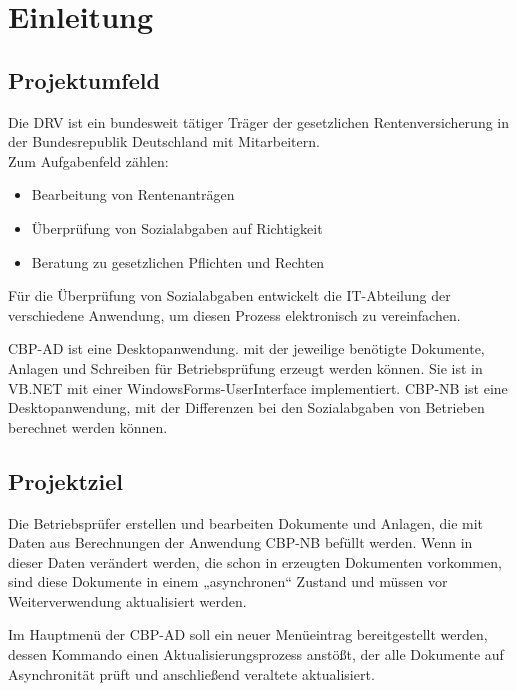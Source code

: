 
\section{Einleitung}
\label{sec:Einleitung}


\subsection{Projektumfeld} 
\label{sec:Projektumfeld}

Die \ac{DRV} ist ein bundesweit tätiger Träger der gesetzlichen Rentenversicherung in der Bundesrepublik Deutschland
mit  Mitarbeitern.\\
Zum Aufgabenfeld zählen:
\begin{itemize}
	\item Bearbeitung von Rentenanträgen
	\item Überprüfung von Sozialabgaben auf Richtigkeit
	\item Beratung zu gesetzlichen Pflichten und Rechten
\end{itemize}

Für die Überprüfung von Sozialabgaben entwickelt die IT-Abteilung der \DRV verschiedene Anwendung, um diesen Prozess elektronisch zu vereinfachen.

\ac{CBP-AD} ist eine Desktopanwendung. mit der jeweilige benötigte Dokumente, Anlagen und Schreiben für Betriebsprüfung erzeugt werden können. Sie ist in \ac{VB}.NET mit einer WindowsForms-UserInterface implementiert.
\ac{CBP-NB} ist eine Desktopanwendung, mit der Differenzen bei den Sozialabgaben von Betrieben berechnet werden können.


\subsection{Projektziel} 
\label{sec:Projektziel}

Die Betriebsprüfer erstellen und bearbeiten Dokumente und Anlagen, die mit Daten aus Berechnungen der Anwendung \acs{CBP-NB} befüllt werden. Wenn in dieser Daten verändert werden, die schon in erzeugten Dokumenten vorkommen, sind diese Dokumente in einem „asynchronen“ Zustand und müssen vor Weiterverwendung aktualisiert werden.

Im Hauptmenü der \acs{CBP-AD} soll ein neuer Menüeintrag bereitgestellt werden, dessen Kommando einen Aktualisierungsprozess anstößt, der alle Dokumente auf Asynchronität prüft und anschließend veraltete aktualisiert.

